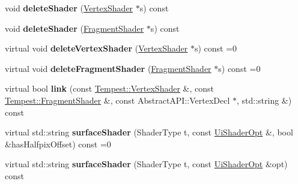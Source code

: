 \begin{DoxyCompactItemize}
\item 
\hypertarget{class_tempest_1_1_abstract_shading_lang_abf1319678d3154fa8d5161060da0d82a}{void {\bfseries delete\+Shader} (\hyperlink{class_tempest_1_1_vertex_shader}{Vertex\+Shader} $\ast$s) const }\label{class_tempest_1_1_abstract_shading_lang_abf1319678d3154fa8d5161060da0d82a}

\item 
\hypertarget{class_tempest_1_1_abstract_shading_lang_ab56e87f58cce30a4c251a238cfe785df}{void {\bfseries delete\+Shader} (\hyperlink{class_tempest_1_1_fragment_shader}{Fragment\+Shader} $\ast$s) const }\label{class_tempest_1_1_abstract_shading_lang_ab56e87f58cce30a4c251a238cfe785df}

\item 
\hypertarget{class_tempest_1_1_abstract_shading_lang_aa18f3296adbd9353b5d7a775d53df0a7}{virtual void {\bfseries delete\+Vertex\+Shader} (\hyperlink{class_tempest_1_1_vertex_shader}{Vertex\+Shader} $\ast$s) const =0}\label{class_tempest_1_1_abstract_shading_lang_aa18f3296adbd9353b5d7a775d53df0a7}

\item 
\hypertarget{class_tempest_1_1_abstract_shading_lang_aeab500f02550a17655ebb1206a047751}{virtual void {\bfseries delete\+Fragment\+Shader} (\hyperlink{class_tempest_1_1_fragment_shader}{Fragment\+Shader} $\ast$s) const =0}\label{class_tempest_1_1_abstract_shading_lang_aeab500f02550a17655ebb1206a047751}

\item 
\hypertarget{class_tempest_1_1_abstract_shading_lang_ae1b8d4e6da76a246775abe341893d152}{virtual bool {\bfseries link} (const \hyperlink{class_tempest_1_1_vertex_shader}{Tempest\+::\+Vertex\+Shader} \&, const \hyperlink{class_tempest_1_1_fragment_shader}{Tempest\+::\+Fragment\+Shader} \&, const Abstract\+A\+P\+I\+::\+Vertex\+Decl $\ast$, std\+::string \&) const }\label{class_tempest_1_1_abstract_shading_lang_ae1b8d4e6da76a246775abe341893d152}

\item 
\hypertarget{class_tempest_1_1_abstract_shading_lang_aebb129c683a45c1ef61389b2a27e145a}{virtual std\+::string {\bfseries surface\+Shader} (Shader\+Type t, const \hyperlink{struct_tempest_1_1_abstract_shading_lang_1_1_ui_shader_opt}{Ui\+Shader\+Opt} \&, bool \&has\+Halfpix\+Offset) const =0}\label{class_tempest_1_1_abstract_shading_lang_aebb129c683a45c1ef61389b2a27e145a}

\item 
\hypertarget{class_tempest_1_1_abstract_shading_lang_afaea6209707e1c39c8be5b80827e1db3}{virtual std\+::string {\bfseries surface\+Shader} (Shader\+Type t, const \hyperlink{struct_tempest_1_1_abstract_shading_lang_1_1_ui_shader_opt}{Ui\+Shader\+Opt} \&opt) const }\label{class_tempest_1_1_abstract_shading_lang_afaea6209707e1c39c8be5b80827e1db3}

\end{DoxyCompactItemize}

